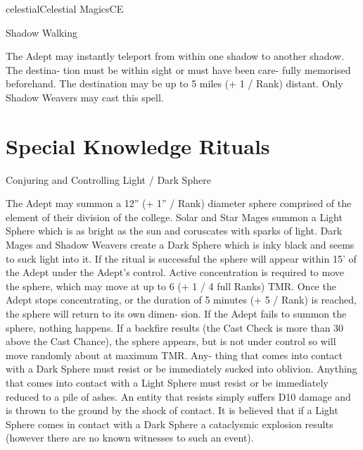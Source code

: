 \begin{College}[1.3]{celestial}{Celestial Magics}{CE}
\begin{spell}[S-10 Shadow]{Shadow Walking}

\begin{effects}
 The  Adept  may  instantly  teleport  from 
within one shadow to another shadow. The destina-
tion  must  be  within  sight  or  must  have  been  care-
fully  memorised  beforehand.  The  destination  may 
be up to 5 miles (+ 1 / Rank) distant. Only Shadow 
Weavers may cast this spell. 


\end{effects}
\end{spell}

\section{Special Knowledge Rituals}

\begin{ritual}[R-1]{Conjuring and Controlling Light / Dark Sphere}

\begin{effects}
 The  Adept  may  summon  a  12”  (+  1”  / 
Rank) diameter sphere comprised of the element of 
their division of the college. Solar and Star Mages 
summon  a  Light  Sphere  which  is  as  bright  as  the 
sun  and  coruscates  with  sparks  of  light.  Dark 
Mages and Shadow Weavers create a Dark Sphere 
which is inky black and seems to suck light into it. 
If  the  ritual  is  successful  the  sphere  will  appear 
within 15’ of the Adept under the Adept’s control. 
Active  concentration  is  required  to  move  the 
sphere,  which  may  move  at  up  to  6  (+  1  /  4  full 
Ranks) TMR. Once the Adept stops concentrating, 
or  the  duration  of  5  minutes  (+  5  /  Rank)  is 
reached,  the  sphere  will  return  to  its  own  dimen-
sion.  If  the  Adept  fails  to  summon  the  sphere, 
nothing  happens.  If  a  backfire  results  (the  Cast 
Check is more than 30 above the Cast Chance), the 
sphere  appears,  but  is  not  under  control  so  will 
move  randomly  about  at  maximum  TMR.  Any-
thing  that  comes  into  contact  with  a  Dark  Sphere 
must resist or be immediately sucked into oblivion. 
Anything  that  comes  into  contact  with  a  Light 
Sphere must resist or be immediately reduced to a 
pile  of  ashes.  An  entity  that  resists  simply  suffers 
D10  damage  and  is  thrown  to  the  ground  by  the 
shock  of  contact.  It  is  believed  that  if  a  Light 
Sphere  comes  in  contact  with  a  Dark  Sphere  a 
cataclysmic  explosion  results  (however  there  are 
no known witnesses to such an event). 
\end{effects}
\end{ritual}



\end{College}
